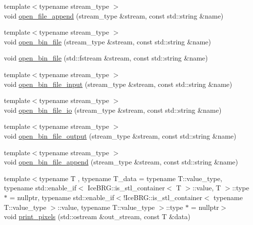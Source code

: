\begin{DoxyCompactItemize}
\item 
{\footnotesize template$<$typename stream\+\_\+type $>$ }\\void \hyperlink{namespaceIceBRG_aaca651220c0f96240a39b6195092b360}{open\+\_\+file\+\_\+append} (stream\+\_\+type \&stream, const std\+::string \&name)
\item 
{\footnotesize template$<$typename stream\+\_\+type $>$ }\\void \hyperlink{namespaceIceBRG_a1636a432cee12f68613153e766cc12c3}{open\+\_\+bin\+\_\+file} (stream\+\_\+type \&stream, const std\+::string \&name)
\item 
void \hyperlink{namespaceIceBRG_a88b24096fcbca74385c3cce8cb6465df}{open\+\_\+bin\+\_\+file} (std\+::fstream \&stream, const std\+::string \&name)
\item 
{\footnotesize template$<$typename stream\+\_\+type $>$ }\\void \hyperlink{namespaceIceBRG_a9edd83707395d401d3156f92c00180bb}{open\+\_\+bin\+\_\+file\+\_\+input} (stream\+\_\+type \&stream, const std\+::string \&name)
\item 
{\footnotesize template$<$typename stream\+\_\+type $>$ }\\void \hyperlink{namespaceIceBRG_a309c9817a7e278ce46a00c29ab30eb60}{open\+\_\+bin\+\_\+file\+\_\+io} (stream\+\_\+type \&stream, const std\+::string \&name)
\item 
{\footnotesize template$<$typename stream\+\_\+type $>$ }\\void \hyperlink{namespaceIceBRG_aaa8c8a1d592d139f48c5c18f94774dfd}{open\+\_\+bin\+\_\+file\+\_\+output} (stream\+\_\+type \&stream, const std\+::string \&name)
\item 
{\footnotesize template$<$typename stream\+\_\+type $>$ }\\void \hyperlink{namespaceIceBRG_afce33e7856f705bb3b736e29d4dcf5c6}{open\+\_\+bin\+\_\+file\+\_\+append} (stream\+\_\+type \&stream, const std\+::string \&name)
\item 
{\footnotesize template$<$typename T , typename T\+\_\+data  = typename T\+::value\+\_\+type, typename std\+::enable\+\_\+if$<$ Ice\+B\+R\+G\+::is\+\_\+stl\+\_\+container$<$ T $>$\+::value, T $>$\+::type $\ast$  = nullptr, typename std\+::enable\+\_\+if$<$!\+Ice\+B\+R\+G\+::is\+\_\+stl\+\_\+container$<$ typename T\+::value\+\_\+type $>$\+::value, typename T\+::value\+\_\+type $>$\+::type $\ast$  = nullptr$>$ }\\void \hyperlink{namespaceIceBRG_a4f6b170fb120d0d143532edc551443d0}{print\+\_\+pixels} (std\+::ostream \&out\+\_\+stream, const T \&data)

\end{DoxyCompactItemize}
